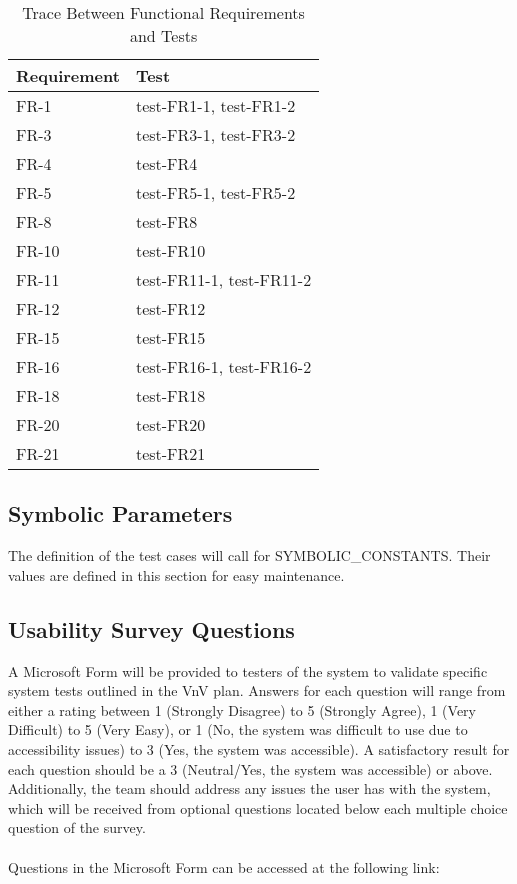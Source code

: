 \documentclass[12pt, titlepage]{article}
\begin{document}
\begin{table}
  \centering
  \begin{tabular}{p{} p{}}
  \toprule
  \textbf{Requirement} & \textbf{Test}\\
  \midrule
  FR-1 & test-FR1-1, test-FR1-2\\
  FR-3 & test-FR3-1, test-FR3-2\\
  FR-4 & test-FR4\\
  FR-5 & test-FR5-1, test-FR5-2\\
  FR-8 & test-FR8\\
  FR-10 & test-FR10\\
  FR-11 & test-FR11-1, test-FR11-2\\
  FR-12 & test-FR12\\
  FR-15 & test-FR15\\
  FR-16 & test-FR16-1, test-FR16-2\\
  FR-18 & test-FR18\\
  FR-20 & test-FR20\\
  FR-21 & test-FR21\\


  \bottomrule
  \end{tabular}
  \caption{Trace Between Functional Requirements and Tests}
  \label{TblRT}
  \end{table}

\subsection{Symbolic Parameters}

The definition of the test cases will call for SYMBOLIC\_CONSTANTS.
Their values are defined in this section for easy maintenance.

\subsection{Usability Survey Questions}

A Microsoft Form will be provided to testers of the system to validate specific
system tests outlined in the VnV plan. Answers for each question will range from either a
rating between 1 (Strongly Disagree) to 5 (Strongly Agree), 1 (Very Difficult) to 5 (Very Easy), or
1 (No, the system was difficult to use due to accessibility issues) to 3 (Yes, the system was accessible).
A satisfactory result for each question should be a 3 (Neutral/Yes, the system was accessible) or above.
Additionally, the team should address any issues the user has with the system, which will be received
from optional questions located below each multiple choice question of the survey.
\\\\Questions in the Microsoft Form can be accessed at the following link:\\
\end{document}
